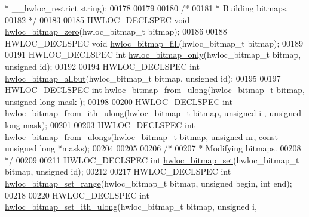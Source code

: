 \begin{DoxyCode}
       * \_\_hwloc\_restrict \textcolor{keywordtype}{string});
00178 
00179 
00180 \textcolor{comment}{/*}
00181 \textcolor{comment}{ * Building bitmaps.}
00182 \textcolor{comment}{ */}
00183 
00185 HWLOC\_DECLSPEC \textcolor{keywordtype}{void} \hyperlink{a00205_gaa97c5217613c8cae9862287170ea2132}{hwloc\_bitmap\_zero}(hwloc\_bitmap\_t bitmap);
00186 
00188 HWLOC\_DECLSPEC \textcolor{keywordtype}{void} \hyperlink{a00205_ga07b2de8786b3cdb22f21d9dd42588275}{hwloc\_bitmap\_fill}(hwloc\_bitmap\_t bitmap);
00189 
00191 HWLOC\_DECLSPEC \textcolor{keywordtype}{int} \hyperlink{a00205_ga10be0840cdeb7ce26d862819dd303baa}{hwloc\_bitmap\_only}(hwloc\_bitmap\_t bitmap, \textcolor{keywordtype}{unsigned} \textcolor{keywordtype}{id});
00192 
00194 HWLOC\_DECLSPEC \textcolor{keywordtype}{int} \hyperlink{a00205_ga06d505f8a1c0a536614f65f503ee6d93}{hwloc\_bitmap\_allbut}(hwloc\_bitmap\_t bitmap, \textcolor{keywordtype}{unsigned} \textcolor{keywordtype}{id});
00195 
00197 HWLOC\_DECLSPEC \textcolor{keywordtype}{int} \hyperlink{a00205_gad59b0ebeb29c1bfabbb2a379e55c1159}{hwloc\_bitmap\_from\_ulong}(hwloc\_bitmap\_t bitmap, \textcolor{keywordtype}{unsigned} \textcolor{keywordtype}{long} mask
      );
00198 
00200 HWLOC\_DECLSPEC \textcolor{keywordtype}{int} \hyperlink{a00205_ga4947c46d47bcfcd3faf3f59569be3e37}{hwloc\_bitmap\_from\_ith\_ulong}(hwloc\_bitmap\_t bitmap, \textcolor{keywordtype}{unsigned} i
      , \textcolor{keywordtype}{unsigned} \textcolor{keywordtype}{long} mask);
00201 
00203 HWLOC\_DECLSPEC \textcolor{keywordtype}{int} \hyperlink{a00205_gabcfef22f6fc4d4b33f068dd91a1c38f5}{hwloc\_bitmap\_from\_ulongs}(hwloc\_bitmap\_t bitmap, \textcolor{keywordtype}{unsigned} nr, \textcolor{keyword}{
      const} \textcolor{keywordtype}{unsigned} \textcolor{keywordtype}{long} *masks);
00204 
00205 
00206 \textcolor{comment}{/*}
00207 \textcolor{comment}{ * Modifying bitmaps.}
00208 \textcolor{comment}{ */}
00209 
00211 HWLOC\_DECLSPEC \textcolor{keywordtype}{int} \hyperlink{a00205_ga062dbff93baeff3b425a7260c5463646}{hwloc\_bitmap\_set}(hwloc\_bitmap\_t bitmap, \textcolor{keywordtype}{unsigned} \textcolor{keywordtype}{id});
00212 
00217 HWLOC\_DECLSPEC \textcolor{keywordtype}{int} \hyperlink{a00205_ga9c9a8433732fb9f24899e7aa4c014d7e}{hwloc\_bitmap\_set\_range}(hwloc\_bitmap\_t bitmap, \textcolor{keywordtype}{unsigned} begin, \textcolor{keywordtype}{int} 
      end);
00218 
00220 HWLOC\_DECLSPEC \textcolor{keywordtype}{int} \hyperlink{a00205_ga3daeed965c35c6d2fd4820a318219985}{hwloc\_bitmap\_set\_ith\_ulong}(hwloc\_bitmap\_t bitmap, \textcolor{keywordtype}{unsigned} i, \textcolor{keywordtype}{
}
\end{DoxyCode}
